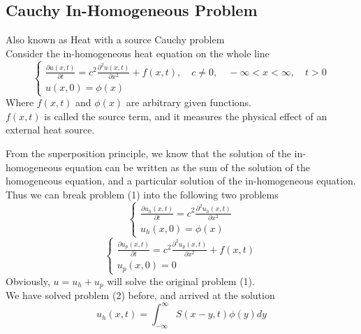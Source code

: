 \subsection{Cauchy In-Homogeneous Problem}
Also known as Heat with a source Cauchy problem
\\
Consider the in-homogeneous heat equation on the whole line
\begin{equation}
    \begin{cases}
        \displaystyle \frac{\partial u\left(x,t \right)}{\partial t} = c^2 \frac{\partial^2 u(x,t)}{\partial x^2} + f(x,t),\quad c\neq 0,\quad-\infty<x<\infty,\quad t>0
        \\
        u\left(x,0 \right) = \phi\left(x\right)
    \end{cases}
\end{equation}
Where $f(x, t)$ and $\phi(x)$ are arbitrary given functions. 
\\$f(x, t)$ is called the source term, and it measures the physical effect of an external heat source.
\par
From the superposition principle, we know that the solution of the in-homogeneous equation can
be written as the sum of the solution of the homogeneous equation, and a particular solution of the
in-homogeneous equation. 
\\
Thus we can break problem (1) into the following two problems
\begin{equation}
    \begin{cases}
        \displaystyle \frac{\partial u_h\left(x,t \right)}{\partial t} = c^2 \frac{\partial^2 u_h(x,t)}{\partial x^2}
        \\
        u_h\left(x,0 \right) = \phi\left(x\right)
    \end{cases}
\end{equation}
\begin{equation}
    \begin{cases}
        \displaystyle \frac{\partial u_p\left(x,t \right)}{\partial t} = c^2 \frac{\partial^2 u_p(x,t)}{\partial x^2}+ f(x,t)
        \\
        u_p\left(x,0 \right) = 0
    \end{cases}
\end{equation}
Obviously, $u = u_h + u_p$ will solve the original problem (1).
\\
We have solved problem (2) before, and arrived at the solution
\begin{equation}
    u_h(x,t) = \int_{-\infty}^{\infty}S(x-y,t) \phi(y)dy        
\end{equation}
